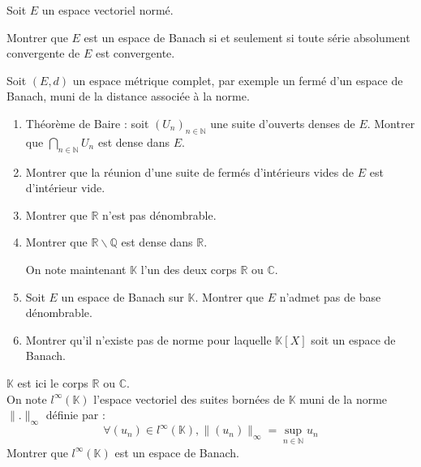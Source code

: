 
\begin{exer}
Soit $E$ un espace vectoriel normé.

Montrer que $E$ est un espace de Banach si et seulement si toute série absolument convergente de $E$ est convergente.
\end{exer}

\begin{exer}
Soit $(E,d)$ un espace métrique complet, par exemple un fermé d'un espace de Banach, muni de la distance associée à la norme.
\begin{enumerate}
\item Théorème de Baire : soit $(U_n)_{n \in \mathbb{N}}$ une suite d'ouverts denses de $E$.
Montrer que $\bigcap_{n \in \mathbb{N}}U_n$ est dense dans $E$.
\item Montrer que la réunion d'une suite de fermés d'intérieurs vides de $E$ est d'intérieur vide.
\item Montrer que $\mathbb{R}$ n'est pas dénombrable.
\item Montrer que $\mathbb{R} \backslash \mathbb{Q}$ est dense dans $\mathbb{R}$.

\medskip
On note maintenant $\mathbb{K}$ l'un des deux corps $\mathbb{R}$ ou $\mathbb{C}$.
\item Soit $E$ un espace de Banach sur $\mathbb{K}$. Montrer que $E$ n'admet pas de base dénombrable.
\item Montrer qu'il n'existe pas de norme pour laquelle $\mathbb{K}[X]$ soit un espace de Banach.
\end{enumerate}
\end{exer}

\begin{exer}
$\mathbb{K}$ est ici le corps $\mathbb{R}$ ou $\mathbb{C}$.\\
On note $l^{\infty}(\mathbb{K})$ l'espace vectoriel des suites bornées de $\mathbb{K}$ muni de la norme $\|.\|_{\infty}$ définie par :
\[\forall (u_n) \in l^{\infty}(\mathbb{K}) , \|(u_n)\|_{\infty} = \sup_{n \in \mathbb{N}} u_n\]
Montrer que $l^{\infty}(\mathbb{K})$ est un espace de Banach.
\end{exer}

